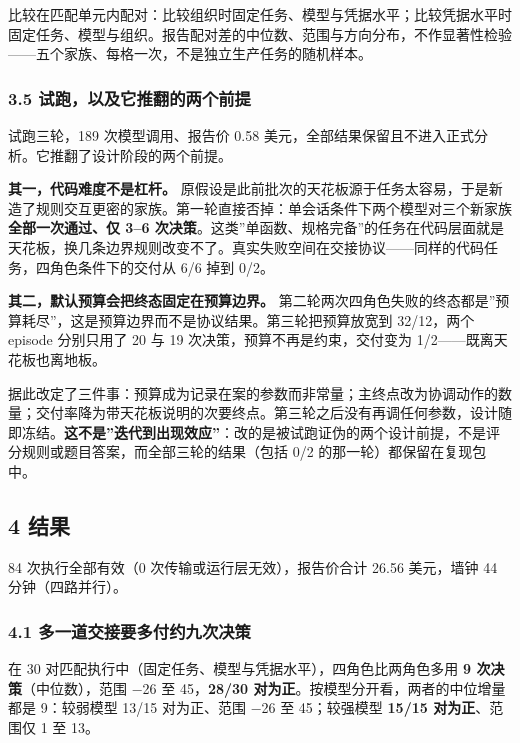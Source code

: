 \documentclass[
]{article}
\begin{document}
比较在匹配单元内配对：比较组织时固定任务、模型与凭据水平；比较凭据水平时固定任务、模型与组织。报告配对差的中位数、范围与方向分布，不作显著性检验------五个家族、每格一次，不是独立生产任务的随机样本。

\subsubsection{3.5
试跑，以及它推翻的两个前提}\label{ux8bd5ux8dd1ux4ee5ux53caux5b83ux63a8ux7ffbux7684ux4e24ux4e2aux524dux63d0}

试跑三轮，189 次模型调用、报告价 0.58
美元，全部结果保留且不进入正式分析。它推翻了设计阶段的两个前提。

\textbf{其一，代码难度不是杠杆。}
原假设是此前批次的天花板源于任务太容易，于是新造了规则交互更密的家族。第一轮直接否掉：单会话条件下两个模型对三个新家族\textbf{全部一次通过、仅
3--6
次决策}。这类''单函数、规格完备''的任务在代码层面就是天花板，换几条边界规则改变不了。真实失败空间在交接协议------同样的代码任务，四角色条件下的交付从
6/6 掉到 0/2。

\textbf{其二，默认预算会把终态固定在预算边界。}
第二轮两次四角色失败的终态都是''预算耗尽''，这是预算边界而不是协议结果。第三轮把预算放宽到
32/12，两个 episode 分别只用了 20 与 19 次决策，预算不再是约束，交付变为
1/2------既离天花板也离地板。

据此改定了三件事：预算成为记录在案的参数而非常量；主终点改为协调动作的数量；交付率降为带天花板说明的次要终点。第三轮之后没有再调任何参数，设计随即冻结。\textbf{这不是''迭代到出现效应''}：改的是被试跑证伪的两个设计前提，不是评分规则或题目答案，而全部三轮的结果（包括
0/2 的那一轮）都保留在复现包中。

\subsection{4 结果}\label{ux7ed3ux679c}

84 次执行全部有效（0 次传输或运行层无效），报告价合计 26.56 美元，墙钟
44 分钟（四路并行）。

\subsubsection{4.1
多一道交接要多付约九次决策}\label{ux591aux4e00ux9053ux4ea4ux63a5ux8981ux591aux4ed8ux7ea6ux4e5dux6b21ux51b3ux7b56}

在 30 对匹配执行中（固定任务、模型与凭据水平），四角色比两角色多用
\textbf{9 次决策}（中位数），范围 −26 至 45，\textbf{28/30
对为正}。按模型分开看，两者的中位增量都是 9：较弱模型 13/15 对为正、范围
−26 至 45；较强模型 \textbf{15/15 对为正}、范围仅 1 至 13。
\end{document}
